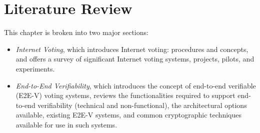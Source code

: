 \chapter{Literature Review}\label{chap:literature}


This chapter is broken into two major sections:

\begin{itemize}

   \item \emph{Internet Voting}, which introduces Internet voting: procedures
      and concepts, and offers a survey of significant Internet voting systems,
      projects, pilots, and experiments.

   \item \emph{End-to-End Verifiability}, which introduces the concept of
      end-to-end verifiable (E2E-V) voting systems, reviews the functionalities
      required to support end-to-end verifiability (technical and
      non-functional), the architectural options available, existing E2E-V
      systems, and common cryptographic techniques available for use in such
      systems.

\end{itemize}

% 

% 





% 

% 
